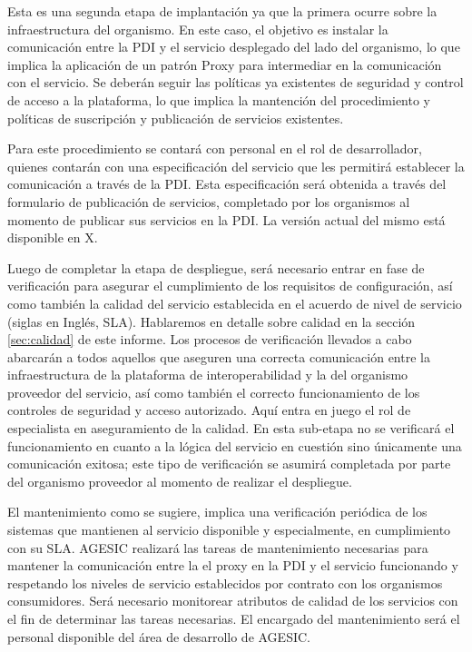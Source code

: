 \documentclass[11pt]{article}
\begin{document}
				Esta es una segunda etapa de implantación ya que la primera ocurre sobre la infraestructura del organismo. En este caso, el objetivo es instalar la comunicación entre la PDI y el servicio desplegado del lado del organismo, lo que implica la aplicación de un patrón Proxy para intermediar en la comunicación con el servicio. Se deberán seguir las políticas ya existentes de seguridad y control de acceso a la plataforma, lo que implica la mantención del procedimiento y políticas de suscripción y publicación de servicios existentes.

				Para este procedimiento se contará con personal en el rol de desarrollador, quienes contarán con una especificación del servicio que les permitirá establecer la comunicación a través de la PDI. Esta especificación será obtenida a través del formulario de publicación de servicios, completado por los organismos al momento de publicar sus servicios en la PDI. La versión actual del mismo está disponible en X.

				Luego de completar la etapa de despliegue, será necesario entrar en fase de verificación para asegurar el cumplimiento de los requisitos de configuración, así como también la calidad del servicio establecida en el acuerdo de nivel de servicio (siglas en Inglés, SLA). Hablaremos en detalle sobre calidad en la sección \ref{sec:calidad} de este informe. Los procesos de verificación llevados a cabo abarcarán a todos aquellos que aseguren una correcta comunicación entre la infraestructura de la plataforma de interoperabilidad y la del organismo proveedor del servicio, así como también el correcto funcionamiento de los controles de seguridad y acceso autorizado. Aquí entra en juego el rol de especialista en aseguramiento de la calidad. En esta sub-etapa no se verificará el funcionamiento en cuanto a la lógica del servicio en cuestión sino únicamente una comunicación exitosa; este tipo de verificación se asumirá completada por parte del organismo proveedor al momento de realizar el despliegue.

				El mantenimiento como se sugiere, implica una verificación periódica de los sistemas que mantienen al servicio disponible y especialmente, en cumplimiento con su SLA. AGESIC realizará las tareas de mantenimiento necesarias para mantener la comunicación entre la el proxy en la PDI y el servicio funcionando y respetando los niveles de servicio establecidos por contrato con los organismos consumidores. Será necesario monitorear atributos de calidad de los servicios con el fin de determinar las tareas necesarias. El encargado del mantenimiento será el personal disponible del área de desarrollo de AGESIC.
\end{document}
